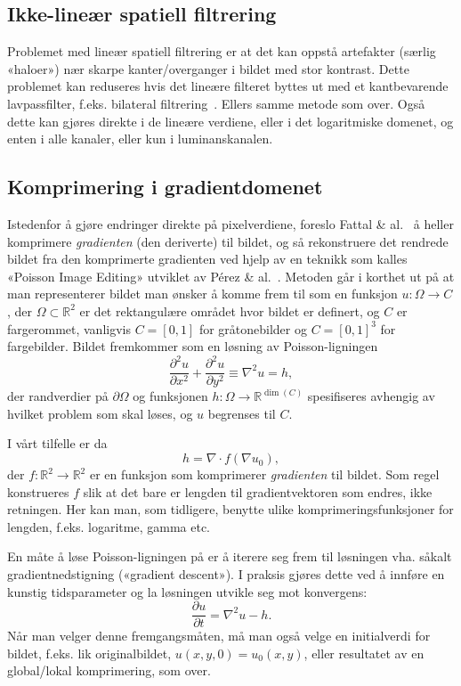 \documentclass[11pt,a4paper]{article}
\begin{document}
\subsection{Ikke-lineær spatiell filtrering}
\label{sec:lok:bilateral}

Problemet med lineær spatiell filtrering er at det kan oppstå artefakter (særlig «haloer») nær skarpe kanter/overganger i bildet med stor kontrast. Dette problemet kan reduseres hvis det lineære filteret byttes ut med et kantbevarende lavpassfilter, f.eks. bilateral filtrering~\cite{Tomasi:98}. Ellers samme metode som over. Også dette kan gjøres direkte i de lineære verdiene, eller i det logaritmiske domenet, og enten i alle kanaler, eller kun i luminanskanalen.

\subsection{Komprimering i gradientdomenet}
\label{sec:fattal}

Istedenfor å gjøre endringer direkte på pixelverdiene, foreslo Fattal \& al.~\cite{Fattal:02} å heller komprimere \emph{gradienten} (den deriverte) til bildet, og så rekonstruere det rendrede bildet fra den komprimerte gradienten ved hjelp av en teknikk som kalles «Poisson Image Editing» utviklet av Pérez \& al.~\cite{Perez:03}. Metoden går i korthet ut på at man representerer bildet man ønsker å komme frem til som en funksjon $u : \Omega \to C$, der $\Omega \subset \mathbb{R}^2$ er det rektangulære området hvor bildet er definert, og $C$ er fargerommet, vanligvis $C = [0, 1]$ for gråtonebilder og $C = [0, 1]^3$ for fargebilder. Bildet fremkommer som en løsning av Poisson-ligningen
$$
\frac{\partial^2 u}{\partial x^2} + \frac{\partial^2 u}{\partial y^2}
\equiv \nabla^2 u = h,
$$
der randverdier på $\partial\Omega$ og funksjonen $h : \Omega \to \mathbb{R}^{\dim(C)}$ spesifiseres avhengig av hvilket problem som skal løses, og $u$ begrenses til $C$.

I vårt tilfelle er da $$h = \nabla\cdot f(\nabla u_0),$$ der $f: \mathbb{R}^2 \to \mathbb{R}^2$ er en funksjon som komprimerer \emph{gradienten} til bildet. Som regel konstrueres $f$ slik at det bare er lengden til gradientvektoren som endres, ikke retningen. Her kan man, som tidligere, benytte ulike kompri\-merings\-funksjoner for lengden, f.eks. logaritme, gamma etc.

En måte å løse Poisson-ligningen på er å iterere seg frem til løsningen vha. såkalt gradientnedstigning («gradient descent»). I praksis gjøres dette ved å innføre en kunstig tidsparameter og la løsningen utvikle seg mot konvergens:
\begin{equation}
\frac{\partial u}{\partial t} = \nabla^2 u - h.
\label{eq:diffusjon}
\end{equation}
Når man velger denne fremgangsmåten, må man også velge en initialverdi for bildet, f.eks. lik originalbildet, $u(x, y, 0) = u_0(x, y)$, eller resultatet av en global/lokal komprimering, som over.
\end{document}
